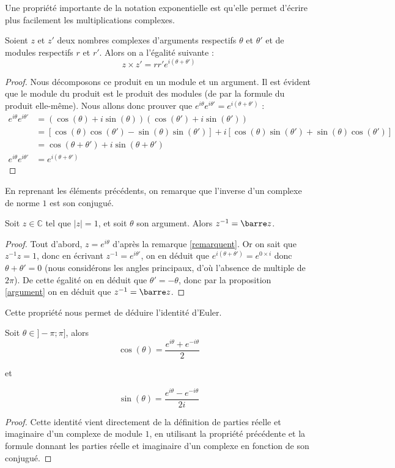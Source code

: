 Une propriété importante de la notation exponentielle est qu'elle permet d'écrire plus facilement les multiplications complexes.

\begin{prop}
    Soient $z$ et $z'$ deux nombres complexes d'arguments respectifs $\theta$ et $\theta'$ et de modules respectifs $r$ et $r'$. Alors on a l'égalité suivante : $$z\times z' = rr'e^{i(\theta+\theta')}$$
\end{prop}
\begin{proof}
    Nous décomposons ce produit en un module et un argument. Il est évident que le module du produit est le produit des modules (de par la formule du produit elle-même). Nous allons donc prouver que $e^{i\theta}e^{i\theta'}=e^{i(\theta+\theta')}$ :
    \begin{align*}
        e^{i\theta}e^{i\theta'}&= (\cos(\theta)+i\sin(\theta))(\cos(\theta')+i\sin(\theta'))\\
        &= \left[\cos(\theta)\cos(\theta')-\sin(\theta)\sin(\theta')\right]+i\left[\cos(\theta)\sin(\theta')+\sin(\theta)\cos(\theta')\right]\\
        &= \cos(\theta+\theta')+i\sin(\theta+\theta')\\
        e^{i\theta}e^{i\theta'}&=e^{i(\theta+\theta')}
    \end{align*}
\end{proof}

En reprenant les éléments précédents, on remarque que l'inverse d'un complexe de norme $1$ est son conjugué.

\begin{prop}
    Soit $z\in\mathbb C$ tel que $|z|=1$, et soit $\theta$ son argument. Alors $z^{-1}=\barre z$.
\end{prop}
\begin{proof}
    Tout d'abord, $z=e^{i\theta}$ d'après la remarque \ref{remarquent}. Or on sait que $z^{-1}z=1$, donc en écrivant $z^{-1}=e^{i\theta'}$, on en déduit que $e^{i(\theta+\theta')}=e^{0\times i}$ donc $\theta+\theta'=0$ (nous considérons les angles principaux, d'où l'absence de multiple de $2\pi$). De cette égalité on en déduit que $\theta'=-\theta$, donc par la proposition \ref{argument} on en déduit que $z^{-1}=\barre z$.
\end{proof}

Cette propriété nous permet de déduire l'identité d'Euler.

\begin{them}
    Soit $\theta\in]-\pi;\pi]$, alors $$\cos(\theta)=\dfrac{e^{i\theta}+e^{-i\theta}}{2}$$ \begin{center} et \end{center} $$\sin(\theta)=\dfrac{e^{i\theta}-e^{-i\theta}}{2i}$$
\end{them}
\begin{proof}
    Cette identité vient directement de la définition de parties réelle et imaginaire d'un complexe de module $1$, en utilisant la propriété précédente et la formule donnant les parties réelle et imaginaire d'un complexe en fonction de son conjugué.
\end{proof}

